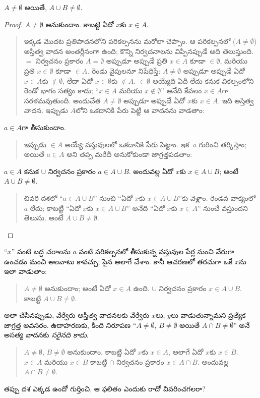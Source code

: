 \documentclass[../../../include/open-logic-section]{subfiles}
\begin{document}
\begin{prop}
$A \neq \emptyset$ అయితే, $A \cup B \neq \emptyset$.
\end{prop}

\begin{proof}
  $A \neq \emptyset$ అనుకుందాం. కాబట్టి ఏదో $x$కు $x \in A$.
  \begin{quote}
    ఇక్కడ మొదట ప్రతిపాదనలోని పరికల్పనను మరోలా చెప్పాం. ఆ పరికల్పనలో ($A \neq \emptyset$) అస్తిత్వ వాదన అంతర్లీనంగా ఉంది; కొన్ని నిర్వచనాలను విప్పినప్పుడే అది తెలుస్తుంది. $=$ నిర్వచనం ప్రకారం $A = \emptyset$ అప్పుడూ అప్పుడే ప్రతి $x \in A$ కూడా $\in \emptyset$, మరియు ప్రతి $x \in
    \emptyset$ కూడా $\in A$. రెండు వైపులనూ నిషేధిస్తే: $A \neq
    \emptyset$ అప్పుడూ అప్పుడే ఏదో $x \in A$కు $\notin \emptyset$, లేదా ఏదో $x \in \emptyset$కు $\notin A$. $\in \emptyset$ అయ్యేది ఏదీ లేదు కనుక వికల్పంలోని రెండో భాగం సత్యం కాదు; ``$x \in A$ మరియు $x
    \notin \emptyset$'' అనేది కేవలం $x \in A$గా సరళమవుతుంది. అందుచేత $A \neq
    \emptyset$ అప్పుడూ అప్పుడే ఏదో $x$కు $x \in A$. ఇది అస్తిత్వ వాదన. ఇప్పుడు $A$లోని  ఒకదానికి పేరు పెట్టి ఆ వాదనను వాడతాం:
  \end{quote}
  $a \in A$గా తీసుకుందాం.
  \begin{quote}
    ఇప్పుడు $\in A$ అయ్యే వస్తువులలో ఒకదానికి పేరు పెట్టాం. ఇక~$a$ గురించి తర్కిస్తాం; అయితే $a \in A$ అని తప్ప మరేదీ అనుకోకుండా జాగ్రత్తపడతాం:
  \end{quote}
  $a \in A$ కనుక $\cup$ నిర్వచనం ప్రకారం $a \in A \cup B$. అందువల్ల ఏదో $x$కు $x \in A \cup B$; అంటే $A \cup B \neq \emptyset$.
  \begin{quote}
    చివరి దశలో ``$a \in A \cup B$'' నుంచి ``ఏదో $x$కు $x \in A \cup B$''కు వెళ్లాం. రెండవ వాక్యంలో $a$ లేదు; కాబట్టి ``ఏదో $x$కు $x \in A \cup B$'' అనేది ``ఏదో $x$కు $x \in A$'' నుంచే వస్తుందని తెలుసు. అంటే $A \cup B \neq
    \emptyset$.
  \end{quote}
\end{proof}

``$x$'' వంటి బద్ధ చరాలను $a$ వంటి పరికల్పనలో తీసుకున్న వస్తువుల పేర్ల నుంచి వేరుగా ఉంచడం మంచి అలవాటు కావచ్చు; పైన అలాగే చేశాం. కానీ ఆచరణలో తరచుగా ఒకే $x$ను ఇలా వాడుతాం:
\begin{quote}
$A \neq \emptyset$ అనుకుందాం; అంటే ఏదో $x \in A$ ఉంది. $\cup$ నిర్వచనం ప్రకారం $x \in A \cup B$. కాబట్టి $A \cup B \neq \emptyset$.
\end{quote}
అలా చేసినప్పుడు, వేర్వేరు అస్తిత్వ వాదనలకు వేర్వేరు $x$లు, $y$లు వాడుతున్నామని ప్రత్యేక జాగ్రత్త అవసరం. ఉదాహరణకు, కింది నిరూపణ ``$A \neq
\emptyset$, $B \neq \emptyset$ అయితే $A \cap B \neq \emptyset$'' అనే అసత్య వాదనకు \emph{సరైనది కాదు}.
\begin{quote}
$A \neq \emptyset$, $B \neq \emptyset$ అనుకుందాం. కాబట్టి ఏదో $x$కు $x
\in A$, అలాగే ఏదో $x$కు $x \in B$. $x \in A$ మరియు $x \in
B$ కాబట్టి $\cap$ నిర్వచనం ప్రకారం $x \in A \cap B$. అందువల్ల $A \cap B \neq
\emptyset$.
\end{quote}
తప్పు దశ ఎక్కడ ఉందో గుర్తించి, ఆ ఫలితం ఎందుకు రాదో వివరించగలరా?
\end{document}

